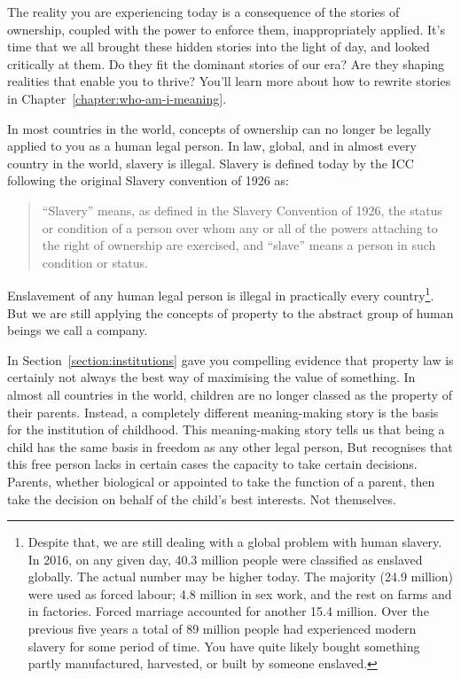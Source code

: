 The reality you are experiencing today is a consequence of the stories of ownership, coupled with the power to enforce them\cite{vant-institutions}, inappropriately applied. It's time that we all brought these hidden stories into the light of day, and looked critically at them. Do they fit the dominant stories of our era? Are they shaping realities that enable you to thrive? You'll learn more about how to rewrite stories in Chapter~\ref{chapter:who-am-i-meaning}. 


In most countries in the world, concepts of ownership can no longer be legally applied to you as a human legal person. In law, global, and in almost every country in the world, slavery is illegal. Slavery is defined today by the ICC\cite{allain-slavery} following the original Slavery convention of 1926 as:


\begin{quote}
“Slavery” means, as defined in the Slavery Convention of 1926, the status or condition of a person over whom any or all of the powers attaching to the right of ownership are exercised, and “slave” means a person in such condition or status.
\end{quote}


Enslavement of any human legal person is illegal in practically every country\footnote{Despite that, we are still dealing with a global problem with human slavery. In 2016, on any given day, 40.3 million\cite{ilo-slavery} people were classified as enslaved globally. The actual number may be higher today. The majority (24.9 million) were used as forced labour; 4.8 million in sex work, and the rest on farms and in factories. Forced marriage accounted for another 15.4 million. Over the previous five years a total of 89 million people had experienced modern slavery for some period of time. You have quite likely bought something partly manufactured, harvested, or built by someone enslaved.}. But we are still applying the concepts of property to the abstract group of human beings we call a company.


In Section~\ref{section:institutions} gave you compelling evidence that property law  is certainly not always the best way of maximising the value of something. In almost all countries in the world, children are no longer classed as the property of their parents. Instead, a completely different meaning\hyp{}making story is the basis for the institution of childhood. This meaning\hyp{}making story tells us that being a child has the same basis in freedom as any other legal person, But recognises that this free person lacks in certain cases the capacity to take certain decisions. Parents, whether biological or appointed to take the function of a parent, then take the decision on behalf of the child’s best interests. Not themselves. 


